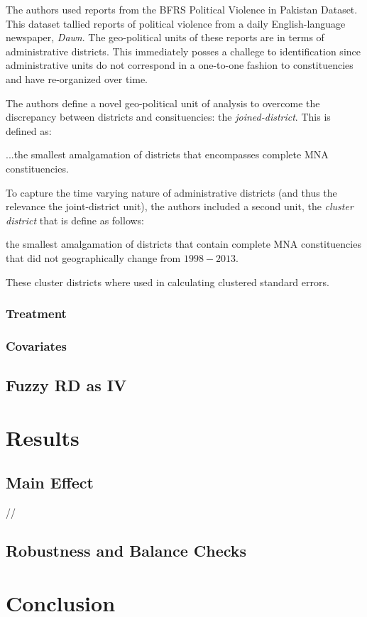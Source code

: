 \documentclass{scrartcl}
\begin{document}
The authors used reports from the BFRS Political Violence in Pakistan Dataset. This dataset tallied reports of political violence from a daily English-language newspaper, \textit{Dawn}. The geo-political units of these reports are in terms of administrative districts. This immediately posses a challege to identification since administrative units do not correspond in a one-to-one fashion to constituencies and have re-organized over time.

The authors define a novel geo-political unit of analysis to overcome the discrepancy between districts and consituencies: the \textit{joined-district}. 
This is defined as:
\begin{displayquote}
...the smallest amalgamation of districts that encompasses complete MNA constituencies. 
\end{displayquote}

To capture the time varying nature of administrative districts (and thus the relevance the joint-district unit), the authors included a second unit, the \textit{cluster district} that is define as follows:

\begin{displayquote}
the smallest amalgamation of districts that contain complete MNA constituencies that did not geographically change from $1998 - 2013$.
\end{displayquote}

These cluster districts where used in calculating clustered standard errors.

\subsubsection{Treatment}

\subsubsection{Covariates}

\subsection{Fuzzy RD as IV}


\section{Results}

\subsection{Main Effect}
//
    

\subsection{Robustness and Balance Checks}

\section{Conclusion}



\end{document}
